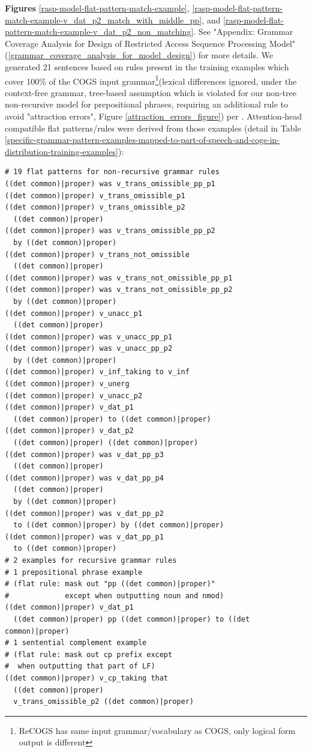 \documentclass[11pt]{article}
\begin{document}
\textbf{Figures} \ref{rasp-model-flat-pattern-match-example}, \ref{rasp-model-flat-pattern-match-example-v_dat_p2_match_with_middle_pp}, and \ref{rasp-model-flat-pattern-match-example-v_dat_p2_non_matching}. See "Appendix: Grammar Coverage Analysis for Design of Restricted Access Sequence Processing Model" (\ref{grammar_coverage_analysis_for_model_design}) for more details. We generated 21 sentences based on rules present in the training examples which cover 100\% of the COGS input grammar\footnote{ReCOGS has same input grammar/vocabulary as COGS, only logical form output is different}(lexical differences ignored, under the context-free grammar, tree-based assumption which is violated for our non-tree non-recursive model for prepositional phrases, requiring an additional rule to avoid "attraction errors", Figure \ref{attraction_errors_figure}) per \cite{fuzzingbook2023:GrammarCoverageFuzzer}.
Attention-head compatible flat patterns/rules were derived from those examples (detail in Table \ref{specific-grammar-pattern-examples-mapped-to-part-of-speech-and-cogs-in-distribution-training-examples}):
\begin{tiny}
\begin{verbatim}
# 19 flat patterns for non-recursive grammar rules
((det common)|proper) was v_trans_omissible_pp_p1
((det common)|proper) v_trans_omissible_p1
((det common)|proper) v_trans_omissible_p2 
  ((det common)|proper)
((det common)|proper) was v_trans_omissible_pp_p2 
  by ((det common)|proper)
((det common)|proper) v_trans_not_omissible 
  ((det common)|proper)
((det common)|proper) was v_trans_not_omissible_pp_p1
((det common)|proper) was v_trans_not_omissible_pp_p2 
  by ((det common)|proper)
((det common)|proper) v_unacc_p1 
  ((det common)|proper)
((det common)|proper) was v_unacc_pp_p1
((det common)|proper) was v_unacc_pp_p2
  by ((det common)|proper)
((det common)|proper) v_inf_taking to v_inf
((det common)|proper) v_unerg
((det common)|proper) v_unacc_p2
((det common)|proper) v_dat_p1 
  ((det common)|proper) to ((det common)|proper)
((det common)|proper) v_dat_p2 
  ((det common)|proper) ((det common)|proper)
((det common)|proper) was v_dat_pp_p3
  ((det common)|proper)
((det common)|proper) was v_dat_pp_p4
  ((det common)|proper) 
  by ((det common)|proper)
((det common)|proper) was v_dat_pp_p2 
  to ((det common)|proper) by ((det common)|proper)
((det common)|proper) was v_dat_pp_p1
  to ((det common)|proper)
# 2 examples for recursive grammar rules
# 1 prepositional phrase example
# (flat rule: mask out "pp ((det common)|proper)" 
#             except when outputting noun and nmod)
((det common)|proper) v_dat_p1 
  ((det common)|proper) pp ((det common)|proper) to ((det common)|proper)
# 1 sentential complement example
# (flat rule: mask out cp prefix except 
#  when outputting that part of LF)
((det common)|proper) v_cp_taking that 
  ((det common)|proper) 
  v_trans_omissible_p2 ((det common)|proper)
\end{verbatim}
\end{tiny}
\end{document}
